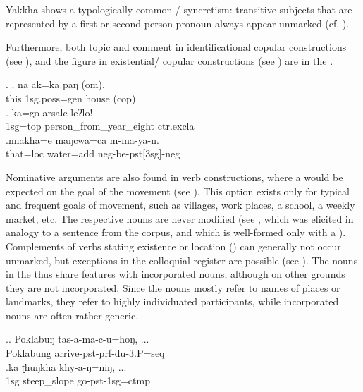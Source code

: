 Yakkha shows a typologically common / syncretism: transitive subjects that are represented by a first or second person pronoun always appear unmarked (cf. ).
	
Furthermore, both topic and comment in identificational copular constructions (see \Next), and  the figure in existential/ copular constructions (see \Next[c]) are in the .
	
\ex. \ag. na ak=ka paŋ (om).\\
		this {\sc 1sg.poss=gen} house ({\sc cop})\\
		\bg.   ka=go      arsale          leʔlo!\\
	{\sc 1sg=top} person\_from\_year\_eight {\sc ctr.excla}		\\
	 	
	\bg.nnakha=e    maŋcwa=ca        m-ma-ya-n.\\
	that{\sc =loc}  water{\sc =add} {\sc neg-}be{\sc -pst[3sg]-neg}\\
	
Nominative arguments are also found in  verb constructions, where a  would be expected on the goal of the movement (see \Next). This option exists only for typical and frequent goals of movement, such as villages, work places, a school, a weekly market, etc. The respective nouns are never modified (see \NNext[a], which was elicited in analogy to a sentence from the corpus, and which is well-formed only with a ). Complements of verbs stating existence or location () can generally not occur unmarked, but exceptions in the colloquial register are possible (see \NNext[b]). The nouns in the  thus share features with incorporated nouns, although on other grounds they are not incorporated. Since the nouns mostly refer to names of places or landmarks, they refer to highly individuated participants, while incorporated nouns are often rather generic. 

	
 	\ex.\ag. Poklabuŋ tas-a-ma-c-u=hoŋ, ...\\
	Poklabung{\sc [loc]} arrive{\sc -pst-prf-du-3.P=seq} 	\\
	 	
\bg.ka  ʈhuŋkha           khy-a-ŋ=niŋ, ...\\
{\sc 1sg} steep\_slope{\sc [loc]} go{\sc -pst-1sg=ctmp}\\

